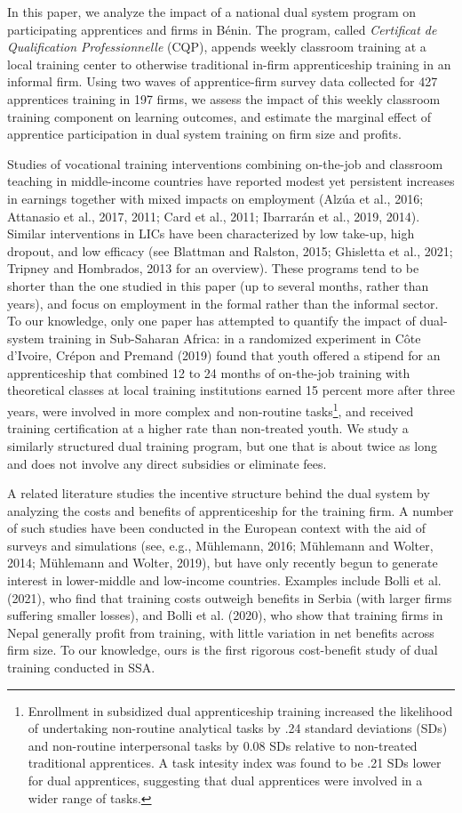 \documentclass[
  11pt,
a4paper
]{article}
\begin{document}
In this paper, we analyze the impact of a national dual system program on participating apprentices and firms in Bénin. The program, called \emph{Certificat de Qualification Professionnelle} (CQP), appends weekly classroom training at a local training center to otherwise traditional in-firm apprenticeship training in an informal firm. Using two waves of apprentice-firm survey data collected for 427 apprentices training in 197 firms, we assess the impact of this weekly classroom training component on learning outcomes, and estimate the marginal effect of apprentice participation in dual system training on firm size and profits.

Studies of vocational training interventions combining on-the-job and classroom teaching in middle-income countries have reported modest yet persistent increases in earnings together with mixed impacts on employment (Alzúa et al., 2016; Attanasio et al., 2017, 2011; Card et al., 2011; Ibarrarán et al., 2019, 2014). Similar interventions in LICs have been characterized by low take-up, high dropout, and low efficacy (see Blattman and Ralston, 2015; Ghisletta et al., 2021; Tripney and Hombrados, 2013 for an overview). These programs tend to be shorter than the one studied in this paper (up to several months, rather than years), and focus on employment in the formal rather than the informal sector. To our knowledge, only one paper has attempted to quantify the impact of dual-system training in Sub-Saharan Africa: in a randomized experiment in Côte d'Ivoire, Crépon and Premand (2019) found that youth offered a stipend for an apprenticeship that combined 12 to 24 months of on-the-job training with theoretical classes at local training institutions earned 15 percent more after three years, were involved in more complex and non-routine tasks\footnote{Enrollment in subsidized dual apprenticeship training increased the likelihood of undertaking non-routine analytical tasks by .24 standard deviations (SDs) and non-routine interpersonal tasks by 0.08 SDs relative to non-treated traditional apprentices. A task intesity index was found to be .21 SDs lower for dual apprentices, suggesting that dual apprentices were involved in a wider range of tasks.}, and received training certification at a higher rate than non-treated youth. We study a similarly structured dual training program, but one that is about twice as long and does not involve any direct subsidies or eliminate fees.

A related literature studies the incentive structure behind the dual system by analyzing the costs and benefits of apprenticeship for the training firm. A number of such studies have been conducted in the European context with the aid of surveys and simulations (see, e.g., Mühlemann, 2016; Mühlemann and Wolter, 2014; Mühlemann and Wolter, 2019), but have only recently begun to generate interest in lower-middle and low-income countries. Examples include Bolli et al. (2021), who find that training costs outweigh benefits in Serbia (with larger firms suffering smaller losses), and Bolli et al. (2020), who show that training firms in Nepal generally profit from training, with little variation in net benefits across firm size. To our knowledge, ours is the first rigorous cost-benefit study of dual training conducted in SSA.
\end{document}
